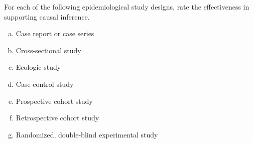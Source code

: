 
For each of the following epidemiological study designs, rate the
effectiveness in supporting causal inference.

\begin{enumerate}[(a)]
\item Case report or case series 
\item Cross-sectional study 
\item Ecologic study 
\item Case-control study 
\item Prospective cohort study 
\item Retrospective cohort study 
\item Randomized, double-blind experimental study 
\end{enumerate}